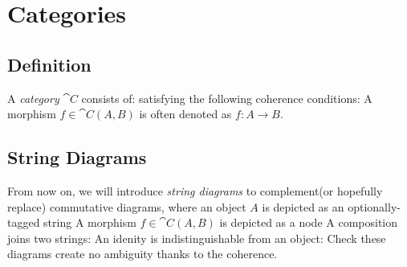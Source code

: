 
\section{Categories}

\subsection{Definition}

A \emph{category} $\cat{C}$ consists of:
satisfying the following coherence conditions:
A morphism $f \in \cat{C}(A,B)$ is often denoted as
$
    f : A \to B
$.


\subsection{String Diagrams}

From now on, we will introduce \emph{string diagrams} %
to complement(or hopefully replace) commutative diagrams, where an object $A$ %
is depicted as an optionally-tagged string
A morphism $f \in \cat{C}(A,B)$ is depicted as a node
A composition joins two strings:
An idenity is indistinguishable from an object:
Check these diagrams create no ambiguity thanks to the coherence.


